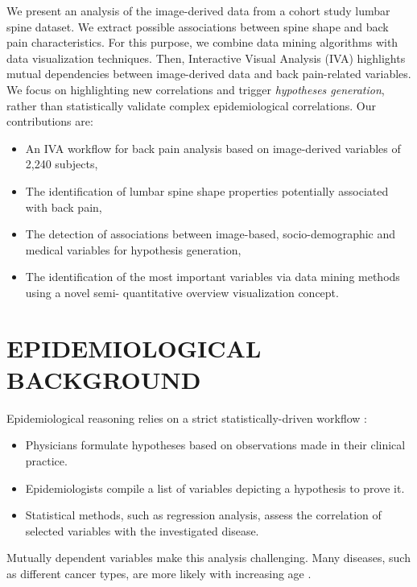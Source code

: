 \documentclass[a4paper,twoside]{style/article}
\begin{document}
We present an analysis of the image-derived data from a cohort study lumbar spine dataset.
We extract possible associations between spine shape and back pain characteristics.
For this purpose, we combine data mining algorithms with data visualization techniques.
Then, Interactive Visual Analysis (IVA) highlights mutual dependencies between image-derived data and back pain-related variables.
We focus on highlighting new correlations and trigger \emph{hypotheses generation}, rather than statistically validate complex epidemiological correlations.
Our contributions are:
\begin{itemize}
\item An IVA workflow for back pain analysis based on image-derived variables of 2,240 subjects,
\item The identification of lumbar spine shape properties potentially associated with back pain,
\item The detection of associations between image-based, socio-demographic and medical variables for hypothesis generation,
\item The identification of the most important variables via data mining methods using a novel semi- quantitative overview visualization concept. %
\end{itemize}
\section{\uppercase{Epidemiological Background}}
\label{sec:EpidemiologicalBackground}
\noindent Epidemiological reasoning relies on a strict statistically-driven workflow \cite{Fletcher}:
\begin{itemize}
	\item Physicians formulate hypotheses based on observations made in their clinical practice.
	\item Epidemiologists compile a list of variables depicting a hypothesis to prove it.
	\item Statistical methods, such as regression analysis, assess the correlation of selected variables with the investigated disease.
\end{itemize}
Mutually dependent variables make this analysis challenging.
Many diseases, such as different cancer types, are more likely with increasing age \cite{Fletcher}.
\end{document}
